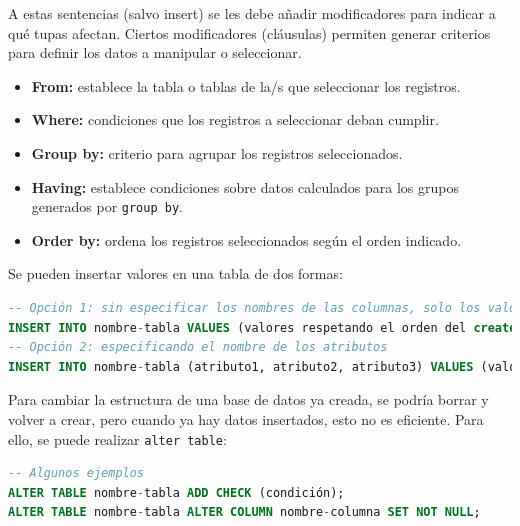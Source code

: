 A estas sentencias (salvo insert) se les debe añadir modificadores para indicar a qué tupas afectan. Ciertos modificadores (cláusulas) permiten generar criterios para definir los datos a manipular o seleccionar.
\begin{itemize}
\item \textbf{From:} establece la tabla o tablas de la/s que seleccionar los registros.
\item \textbf{Where:} condiciones que los registros a seleccionar deban cumplir.
\item \textbf{Group by:} criterio para agrupar los registros seleccionados.
\item \textbf{Having:} establece condiciones sobre datos calculados para los grupos generados por \texttt{group by}.
\item \textbf{Order by:} ordena los registros seleccionados según el orden indicado.
\end{itemize}

Se pueden insertar valores en una tabla de dos formas:
\begin{lstlisting}[language=SQL]
-- Opción 1: sin especificar los nombres de las columnas, solo los valores
INSERT INTO nombre-tabla VALUES (valores respetando el orden del create table);
-- Opción 2: especificando el nombre de los atributos
INSERT INTO nombre-tabla (atributo1, atributo2, atributo3) VALUES (valor1, valor2, null)
\end{lstlisting}

Para cambiar la estructura de una base de datos ya creada, se podría borrar y volver a crear, pero cuando ya hay datos insertados, esto no es eficiente. Para ello, se puede realizar \texttt{alter table}:
\begin{lstlisting}[language=SQL]
-- Algunos ejemplos
ALTER TABLE nombre-tabla ADD CHECK (condición);
ALTER TABLE nombre-tabla ALTER COLUMN nombre-columna SET NOT NULL;
\end{lstlisting}
